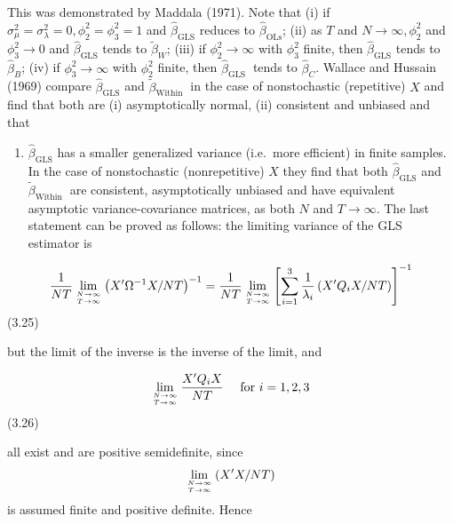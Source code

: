 \documentclass[
]{book}
\providecommand{\tightlist}{%
  \setlength{\itemsep}{0pt}\setlength{\parskip}{0pt}}
\begin{document}
This was demonstrated by Maddala (1971). Note that (i) if \(\sigma_{\mu}^{2}=\sigma_{\lambda}^{2}=0, \phi_{2}^{2}=\phi_{3}^{2}=1\) and \(\widehat{\beta}_{\mathrm{GLS}}\) reduces to \(\widehat{\beta}_{\mathrm{OLs}}\); (ii) as \(T\) and \(N \rightarrow \infty, \phi_{2}^{2}\) and \(\phi_{3}^{2} \rightarrow 0\) and \(\widehat{\beta}_{\mathrm{GLS}}\) tends to \(\widetilde{\beta}_{W}\); (iii) if
\(\phi_{2}^{2} \rightarrow \infty\) with \(\phi_{3}^{2}\) finite, then \(\widehat{\beta}_{\mathrm{GLS}}\) tends to \(\widehat{\beta}_{B}\); (iv) if \(\phi_{3}^{2} \rightarrow \infty\) with \(\phi_{2}^{2}\) finite, then \(\widehat{\beta}_{\text {GLS }}\) tends to \(\widehat{\beta}_{C}\).
Wallace and Hussain (1969) compare \(\widehat{\beta}_{\mathrm{GLS}}\) and \(\widetilde{\beta}_{\text {Within }}\) in the case of nonstochastic (repetitive) \(X\) and find that both are (i) asymptotically normal, (ii) consistent and unbiased and that

\begin{enumerate}
\def\labelenumi{(\roman{enumi})}
\setcounter{enumi}{2}
\tightlist
\item
  \(\widehat{\beta}_{\mathrm{GLS}}\) has a smaller generalized variance (i.e.~more efficient) in finite samples. In the case of nonstochastic (nonrepetitive) \(X\) they find that both \(\widehat{\beta}_{\mathrm{GLS}}\) and \(\widetilde{\beta}_{\text {Within }}\) are consistent, asymptotically unbiased and have equivalent asymptotic variance-covariance matrices, as both \(N\) and \(T \rightarrow \infty\). The last statement can be proved as follows: the limiting variance of the GLS estimator is
\end{enumerate}

\begin{equation}
\frac{1}{N T} \lim _{N \rightarrow \infty \atop T \rightarrow \infty}\left(X^{\prime} \Omega^{-1} X / N T\right)^{-1}=\frac{1}{N T} \lim _{N \rightarrow \infty \atop T \rightarrow \infty}\left[\sum_{i=1}^{3} \frac{1}{\lambda_{i}}\left(X^{\prime} Q_{i} X / N T\right)\right]^{-1}
\end{equation} (3.25)

but the limit of the inverse is the inverse of the limit, and

\begin{equation}
\lim _{N \rightarrow \infty \atop T \rightarrow \infty} \frac{X^{\prime} Q_{i} X}{N T} \quad \text { for } i=1,2,3
\end{equation} (3.26)

all exist and are positive semidefinite, since \[\lim _{N \rightarrow \infty \atop T \rightarrow \infty}\left(X^{\prime} X / N T\right)\] is assumed finite and positive definite. Hence
\end{document}
